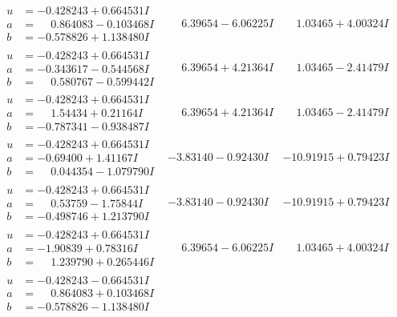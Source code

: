 \documentclass[1p]{elsarticle_modified}
\theoremstyle{definition}
\begin{document}
$$\begin{array}{c|c|c}
\begin{aligned}
u &= -0.428243 + 0.664531 I \\
a &= \phantom{-}0.864083 - 0.103468 I \\
b &= -0.578826 + 1.138480 I\end{aligned}
 & \phantom{-}6.39654 - 6.06225 I & \phantom{-}1.03465 + 4.00324 I \\ \hline\begin{aligned}
u &= -0.428243 + 0.664531 I \\
a &= -0.343617 - 0.544568 I \\
b &= \phantom{-}0.580767 - 0.599442 I\end{aligned}
 & \phantom{-}6.39654 + 4.21364 I & \phantom{-}1.03465 - 2.41479 I \\ \hline\begin{aligned}
u &= -0.428243 + 0.664531 I \\
a &= \phantom{-}1.54434 + 0.21164 I \\
b &= -0.787341 - 0.938487 I\end{aligned}
 & \phantom{-}6.39654 + 4.21364 I & \phantom{-}1.03465 - 2.41479 I \\ \hline\begin{aligned}
u &= -0.428243 + 0.664531 I \\
a &= -0.69400 + 1.41167 I \\
b &= \phantom{-}0.044354 - 1.079790 I\end{aligned}
 & -3.83140 - 0.92430 I & -10.91915 + 0.79423 I \\ \hline\begin{aligned}
u &= -0.428243 + 0.664531 I \\
a &= \phantom{-}0.53759 - 1.75844 I \\
b &= -0.498746 + 1.213790 I\end{aligned}
 & -3.83140 - 0.92430 I & -10.91915 + 0.79423 I \\ \hline\begin{aligned}
u &= -0.428243 + 0.664531 I \\
a &= -1.90839 + 0.78316 I \\
b &= \phantom{-}1.239790 + 0.265446 I\end{aligned}
 & \phantom{-}6.39654 - 6.06225 I & \phantom{-}1.03465 + 4.00324 I \\ \hline\begin{aligned}
u &= -0.428243 - 0.664531 I \\
a &= \phantom{-}0.864083 + 0.103468 I \\
b &= -0.578826 - 1.138480 I\end{aligned}

\end{array}$$
\end{document}

